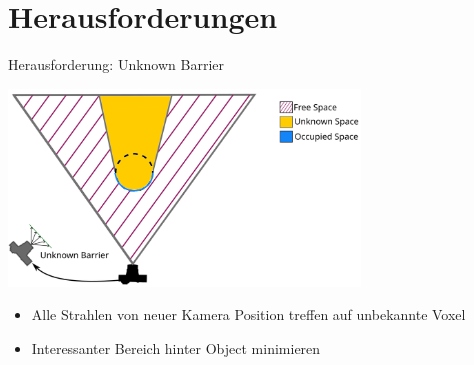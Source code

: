 \documentclass{beamer}
\begin{document}
\section{Herausforderungen}
\begin{frame}{Herausforderung: Unknown Barrier}
	\begin{block}{}
		\begin{center}
			\includegraphics[width=0.7\textwidth]{Graphics/unknown_barrier_vscott_1.png}
		\end{center}
		\begin{itemize}
			\item Alle Strahlen von neuer Kamera Position treffen auf unbekannte Voxel
			\item Interessanter Bereich hinter Object minimieren
		\end{itemize}
	\end{block}
\end{frame}
\end{document}
